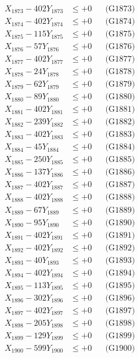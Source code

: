 \documentclass[a4paper,10pt]{article}
\begin{document}
{\begin{align}
X_{1873} - 402Y_{1873} &\leq +0 && \text{(G1873)} \\
X_{1874} - 402Y_{1874} &\leq +0 && \text{(G1874)} \\
X_{1875} - 115Y_{1875} &\leq +0 && \text{(G1875)} \\
X_{1876} - 57Y_{1876} &\leq +0 && \text{(G1876)} \\
X_{1877} - 402Y_{1877} &\leq +0 && \text{(G1877)} \\
X_{1878} - 24Y_{1878} &\leq +0 && \text{(G1878)} \\
X_{1879} - 62Y_{1879} &\leq +0 && \text{(G1879)} \\
X_{1880} - 89Y_{1880} &\leq +0 && \text{(G1880)} \\
\allowbreak
X_{1881} - 402Y_{1881} &\leq +0 && \text{(G1881)} \\
X_{1882} - 239Y_{1882} &\leq +0 && \text{(G1882)} \\
X_{1883} - 402Y_{1883} &\leq +0 && \text{(G1883)} \\
X_{1884} - 45Y_{1884} &\leq +0 && \text{(G1884)} \\
X_{1885} - 250Y_{1885} &\leq +0 && \text{(G1885)} \\
X_{1886} - 137Y_{1886} &\leq +0 && \text{(G1886)} \\
X_{1887} - 402Y_{1887} &\leq +0 && \text{(G1887)} \\
X_{1888} - 402Y_{1888} &\leq +0 && \text{(G1888)} \\
X_{1889} - 67Y_{1889} &\leq +0 && \text{(G1889)} \\
X_{1890} - 95Y_{1890} &\leq +0 && \text{(G1890)} \\
\allowbreak
X_{1891} - 402Y_{1891} &\leq +0 && \text{(G1891)} \\
X_{1892} - 402Y_{1892} &\leq +0 && \text{(G1892)} \\
X_{1893} - 40Y_{1893} &\leq +0 && \text{(G1893)} \\
X_{1894} - 402Y_{1894} &\leq +0 && \text{(G1894)} \\
X_{1895} - 113Y_{1895} &\leq +0 && \text{(G1895)} \\
X_{1896} - 302Y_{1896} &\leq +0 && \text{(G1896)} \\
X_{1897} - 402Y_{1897} &\leq +0 && \text{(G1897)} \\
X_{1898} - 205Y_{1898} &\leq +0 && \text{(G1898)} \\
X_{1899} - 129Y_{1899} &\leq +0 && \text{(G1899)} \\
X_{1900} - 599Y_{1900} &\leq +0 && \text{(G1900)} \\

\end{align}}
\end{document}
